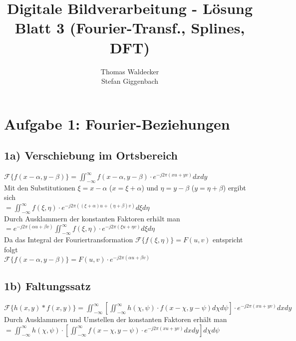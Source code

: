 \documentclass[a4paper,11pt,oneside]{scrartcl}
\title{Digitale Bildverarbeitung - Lösung Blatt 3 (Fourier-Transf., Splines, DFT)}
\author{Thomas Waldecker\\Stefan Giggenbach}
\begin{document}
\maketitle

\newpage

\section*{Aufgabe 1: Fourier-Beziehungen}
\subsection*{1a) Verschiebung im Ortsbereich}

$\mathcal{F}\{f(x-\alpha,y-\beta)\}=\iint_{-\infty}^{\infty}f(x-\alpha,y-\beta)\cdot e^{-j2\pi(xu+yv)} dx dy$ \\

Mit den Substitutionen $\xi=x-\alpha$ ($x=\xi+\alpha$) und $\eta=y-\beta$ ($y=\eta+\beta$) ergibt sich \\

$=\iint_{-\infty}^{\infty}f(\xi,\eta)\cdot e^{-j2\pi((\xi+\alpha)u+(\eta+\beta)v)} d\xi d\eta$ \\

Durch Ausklammern der konstanten Faktoren erhält man \\

$=e^{-j2\pi(\alpha u+\beta v)}\iint_{-\infty}^{\infty}f(\xi,\eta)\cdot e^{-j2\pi(\xi u+\eta v)} d\xi d\eta$ \\

Da das Integral der Fouriertransformation $\mathcal{F}\{f(\xi,\eta)\}=F(u,v)$ entspricht folgt \\

$\mathcal{F}\{f(x-\alpha,y-\beta)\}=F(u,v)\cdot e^{-j2\pi(\alpha u+\beta v)}$

\subsection*{1b) Faltungssatz}

$\mathcal{F}\{h(x,y)\ast f(x,y)\}=\iint_{-\infty}^{\infty}[\iint_{-\infty}^{\infty}h(\chi,\psi)\cdot f(x-\chi,y-\psi) d\chi d\psi]\cdot e^{-j2\pi(xu+yv)} dx dy$ \\

Durch Ausklammern und Umstellen der konstanten Faktoren erhält man \\

$=\iint_{-\infty}^{\infty}h(\chi,\psi)\cdot[\iint_{-\infty}^{\infty}f(x-\chi,y-\psi)\cdot e^{-j2\pi(xu+yv)} dx dy] d\chi d\psi$ \\
\end{document}
